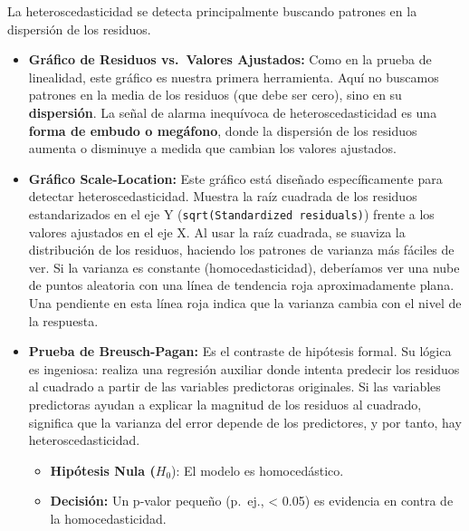 \documentclass[
  letterpaper,
  DIV=11,
  numbers=noendperiod]{scrreprt}
\providecommand{\tightlist}{%
  \setlength{\itemsep}{0pt}\setlength{\parskip}{0pt}}
\begin{document}
La heteroscedasticidad se detecta principalmente buscando patrones en la
dispersión de los residuos.

\begin{itemize}
\item
  \textbf{Gráfico de Residuos vs.~Valores Ajustados:} Como en la prueba
  de linealidad, este gráfico es nuestra primera herramienta. Aquí no
  buscamos patrones en la media de los residuos (que debe ser cero),
  sino en su \textbf{dispersión}. La señal de alarma inequívoca de
  heteroscedasticidad es una \textbf{forma de embudo o megáfono}, donde
  la dispersión de los residuos aumenta o disminuye a medida que cambian
  los valores ajustados.
\item
  \textbf{Gráfico Scale-Location:} Este gráfico está diseñado
  específicamente para detectar heteroscedasticidad. Muestra la raíz
  cuadrada de los residuos estandarizados en el eje Y
  (\texttt{sqrt(\textbar{}Standardized\ residuals\textbar{})}) frente a
  los valores ajustados en el eje X. Al usar la raíz cuadrada, se
  suaviza la distribución de los residuos, haciendo los patrones de
  varianza más fáciles de ver. Si la varianza es constante
  (homocedasticidad), deberíamos ver una nube de puntos aleatoria con
  una línea de tendencia roja aproximadamente plana. Una pendiente en
  esta línea roja indica que la varianza cambia con el nivel de la
  respuesta.
\item
  \textbf{Prueba de Breusch-Pagan:} Es el contraste de hipótesis formal.
  Su lógica es ingeniosa: realiza una regresión auxiliar donde intenta
  predecir los residuos al cuadrado a partir de las variables
  predictoras originales. Si las variables predictoras ayudan a explicar
  la magnitud de los residuos al cuadrado, significa que la varianza del
  error depende de los predictores, y por tanto, hay
  heteroscedasticidad.

  \begin{itemize}
  \tightlist
  \item
    \textbf{Hipótesis Nula (}\(H_0\)): El modelo es homocedástico.
  \item
    \textbf{Decisión:} Un p-valor pequeño (p.~ej., \textless{} 0.05) es
    evidencia en contra de la homocedasticidad.
  \end{itemize}
\end{itemize}
\end{document}
